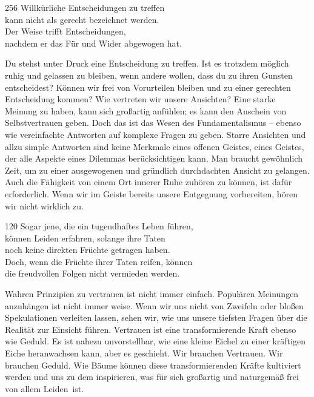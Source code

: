 
\begin{dhpVerse}{256}
\label{dhp-256}
Willkürliche Entscheidungen zu treffen\\ 
kann nicht als gerecht bezeichnet werden.\\ 
Der Weise trifft Entscheidungen,\\ 
nachdem er das Für und Wider abgewogen hat. 
\end{dhpVerse}

\begin{dhpRefl}

Du stehst unter Druck eine Entscheidung zu treffen. Ist es trotzdem möglich
ruhig und gelassen zu bleiben, wenn andere wollen, dass du zu ihren Gunsten
entscheidest? Können wir frei von Vorurteilen bleiben und zu einer gerechten
Entscheidung kommen? Wie vertreten wir unsere Ansichten? Eine starke Meinung zu
haben, kann sich großartig anfühlen; es kann den Anschein von Selbstvertrauen
geben. Doch das ist das Wesen des Fundamentalismus -- ebenso wie vereinfachte
Antworten auf komplexe Fragen zu geben. Starre Ansichten und allzu simple
Antworten sind keine Merkmale eines offenen Geistes, eines Geistes, der alle
Aspekte eines Dilemmas berücksichtigen kann. Man braucht gewöhnlich Zeit, um
zu einer ausgewogenen und gründlich durchdachten Ansicht zu gelangen. Auch die
Fähigkeit von einem Ort innerer Ruhe zuhören zu können, ist dafür
erforderlich. Wenn wir im Geiste bereits unsere Entgegnung vorbereiten, hören
wir nicht wirklich zu.

\end{dhpRefl}


\begin{dhpVerse}{120}
\label{dhp-120}
Sogar jene, die ein tugendhaftes Leben führen,\\ 
können Leiden erfahren, solange ihre Taten\\ 
noch keine direkten Früchte getragen haben.\\ 
Doch, wenn die Früchte ihrer Taten reifen, können\\ 
die freudvollen Folgen nicht vermieden werden. 
\end{dhpVerse}

\begin{dhpRefl}

Wahren Prinzipien zu vertrauen ist nicht immer einfach. Populären Meinungen
anzuhängen ist nicht immer weise. Wenn wir uns nicht von Zweifeln oder bloßen
Spekulationen verleiten lassen, sehen wir, wie uns unsere tiefsten Fragen über
die Realität zur Einsicht führen. Vertrauen ist eine transformierende Kraft
ebenso wie Geduld. Es ist nahezu unvorstellbar, wie eine kleine Eichel zu
einer kräftigen Eiche heranwachsen kann, aber es geschieht. Wir brauchen
Vertrauen. Wir brauchen Geduld. Wie Bäume können diese transformierenden
Kräfte kultiviert werden und uns zu dem inspirieren, was für sich großartig
und naturgemäß frei von allem Leiden~ist.

\end{dhpRefl}

